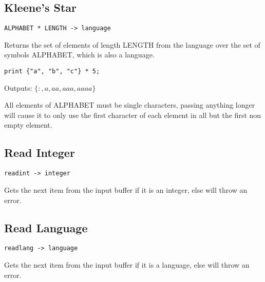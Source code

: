 \subsection{Kleene's Star}
\begin{center}
\begin{minipage}{6cm}
\begin{verbatim}
ALPHABET * LENGTH -> language
\end{verbatim}
\end{minipage}
\end{center}
\begin{normalsize}
Returns the set of elements of length LENGTH from the language over the set of symbols ALPHABET, which is also a language.

\begin{center}
\begin{minipage}{5cm}
\begin{verbatim}
print {"a", "b", "c"} * 5;
\end{verbatim}
\end{minipage}
\end{center}
Outputs: $ \{:, a, aa, aaa, aaaa\} $

All elements of ALPHABET must be single characters, passing anything longer will cause it to only use the first character of each element in all but the first non empty element.
\end{normalsize}

\subsection{Read Integer}
\begin{center}
\begin{minipage}{5cm}
\begin{verbatim}
readint -> integer
\end{verbatim}
\end{minipage}
\end{center}
\begin{normalsize}
Gets the next item from the input buffer if it is an integer, else will throw an error.
\end{normalsize}

\subsection{Read Language}
\begin{center}
\begin{minipage}{5cm}
\begin{verbatim}
readlang -> language
\end{verbatim}
\end{minipage}
\end{center}
\begin{normalsize}
Gets the next item from the input buffer if it is a language, else will throw an error.
\end{normalsize}




